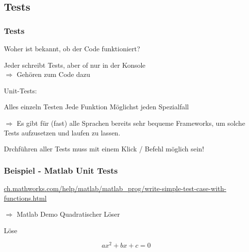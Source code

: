 \documentclass{beamer}
\begin{document}
\subsection{Tests}
\begin{frame}
    \frametitle{Tests}
    Woher ist bekannt, ob der Code funktioniert?\pause

    Jeder schreibt Tests, aber of nur in der Konsole\\
    $\Rightarrow$ Gehören zum Code dazu

    \vspace{1em}\pause Unit-Tests:
    \begin{outline}
        \1 Alles einzeln Testen
            \2 Jede Funktion
            \2 Möglichst jeden Spezialfall
    \end{outline}
    $\Rightarrow$ Es gibt für (fast) alle Sprachen bereits sehr bequeme
    Frameworks, um solche Tests aufzusetzen und laufen zu lassen.

    \vspace{1em} \color{red} Drchführen aller Tests muss mit einem Klick
/ Befehl möglich sein!
\end{frame}
\begin{frame}
    \frametitle{Beispiel - Matlab Unit Tests}
    \url{ch.mathworks.com/help/matlab/matlab_prog/write-simple-test-case-with-functions.html}
    \vspace{2em}

    $\Rightarrow$ Matlab Demo Quadratischer Löser

    \vspace{1em}Löse
    \begin{center}\begin{equation*}
        ax^2+bx+c=0
    \end{equation*}\end{center}
\end{frame}
\end{document}
